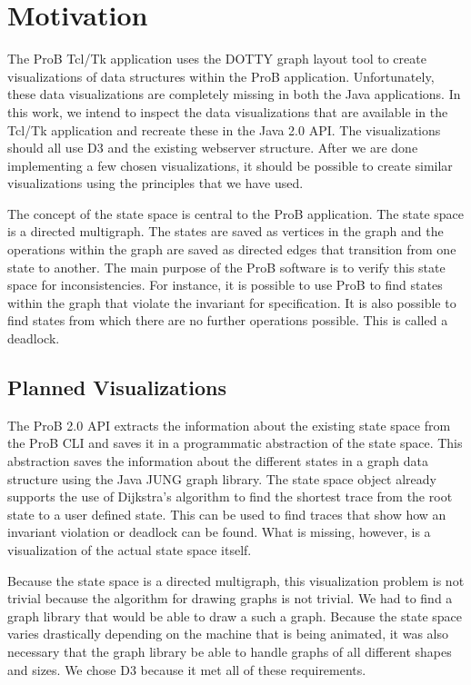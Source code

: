 \section{Motivation}

The ProB Tcl/Tk application uses the DOTTY graph layout tool to create visualizations of data structures within the ProB application. Unfortunately, these data visualizations are completely missing in both the Java applications. In this work, we intend to inspect the data visualizations that are available in the Tcl/Tk application and recreate these in the Java 2.0 API. The visualizations should all use D3 and the existing webserver structure. After we are done implementing a few chosen visualizations, it should be possible to create similar visualizations using the principles that we have used. 

The concept of the state space is central to the ProB application. The state space is a directed multigraph. The states are saved as vertices in the graph and the operations within the graph are saved as directed edges that transition from one state to another. The main purpose of the ProB software is to verify this state space for inconsistencies. For instance, it is possible to use ProB to find states within the graph that violate the invariant for specification. It is also possible to find states from which there are no further operations possible. This is called a deadlock.

\subsection{Planned Visualizations}

The ProB 2.0 API extracts the information about the existing state space from the ProB CLI and saves it in a programmatic abstraction of the state space. This abstraction saves the information about the different states in a graph data structure using the Java JUNG graph library. The state space object already supports the use of Dijkstra's algorithm to find the shortest trace from the root state to a user defined state. This can be used to find traces that show how an invariant violation or deadlock can be found. What is missing, however, is a visualization of the actual state space itself.

Because the state space is a directed multigraph, this visualization problem is not trivial because the algorithm for drawing graphs is not trivial. We had to find a graph library that would be able to draw a such a graph. Because the state space varies drastically depending on the machine that is being animated, it was also necessary that the graph library be able to handle graphs of all different shapes and sizes. We chose D3 because it met all of these requirements.

